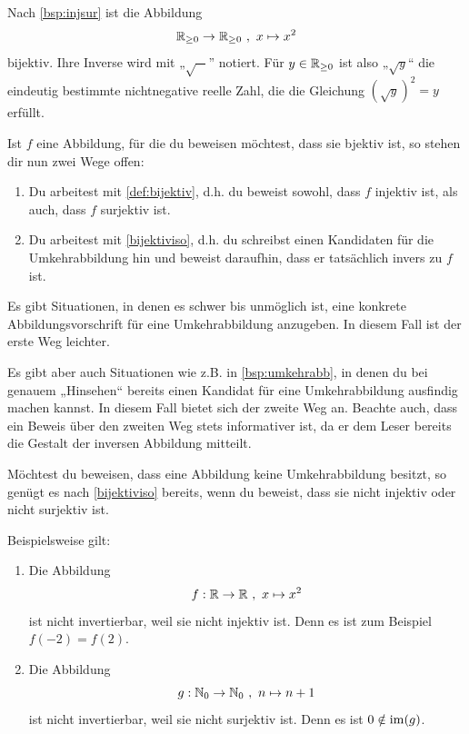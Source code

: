 \begin{bsp}
    Nach \cref{bsp:injsur} ist die Abbildung
        \[ \mathbb R_{\ge 0} \to \mathbb R_{\ge 0} \ ,\ x \mapsto x^2 \]
    bijektiv. Ihre Inverse wird mit „$\sqrt{-}$” notiert. Für $y\in \mathbb R_{\ge 0}$ ist also „$\sqrt{y}$“ die eindeutig bestimmte nichtnegative reelle Zahl, die die Gleichung $(\sqrt{y})^2=y$ erfüllt.
\end{bsp}


\begin{bem}
    Ist $f$ eine Abbildung, für die du beweisen möchtest, dass sie bjektiv ist, so stehen dir nun zwei Wege offen:
    \begin{enumerate}
        \item Du arbeitest mit \cref{def:bijektiv}, d.h. du beweist sowohl, dass $f$ injektiv ist, als auch, dass $f$ surjektiv ist.
        \item Du arbeitest mit \cref{bijektiviso}, d.h. du schreibst einen Kandidaten für die Umkehrabbildung hin und beweist daraufhin, dass er tatsächlich invers zu $f$ ist.
    \end{enumerate}
    Es gibt Situationen, in denen es schwer bis unmöglich ist, eine konkrete Abbildungsvorschrift für eine Umkehrabbildung anzugeben. In diesem Fall ist der erste Weg leichter.
    
    Es gibt aber auch Situationen wie z.B. in \cref{bsp:umkehrabb}, in denen du bei genauem „Hinsehen“ bereits einen Kandidat für eine Umkehrabbildung ausfindig machen kannst. In diesem Fall bietet sich der zweite Weg an. Beachte auch, dass ein Beweis über den zweiten Weg stets informativer ist, da er dem Leser bereits die Gestalt der inversen Abbildung mitteilt.
\end{bem}


\begin{bem} \label{invwiderleg}
    Möchtest du beweisen, dass eine Abbildung keine Umkehrabbildung besitzt, so genügt es nach \cref{bijektiviso} bereits, wenn du beweist, dass sie nicht injektiv oder nicht surjektiv ist.
\end{bem}


\begin{bsp}
    Beispielsweise gilt:
    \begin{enumerate}
        \item Die Abbildung
            \[ f : \R \to \R \ ,\ x\mapsto x^2\]
        ist nicht invertierbar, weil sie nicht injektiv ist. Denn es ist zum Beispiel $f(-2)=f(2)$.
        \item Die Abbildung
            \[ g : \N_0 \to \N_0 \ ,\ n \mapsto n+1 \]
        ist nicht invertierbar, weil sie nicht surjektiv ist. Denn es ist $0\notin \operatorname{im}(g)$.
    \end{enumerate}
\end{bsp}





